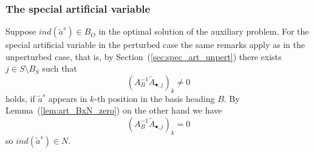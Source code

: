 \documentclass[a4paper]{article}
\begin{document}
\subsubsection{The special artificial variable}
Suppose $ind(\tilde{a}^{s}) \in B_{O}$ in the optimal solution of the auxiliary
problem.
For the special artificial variable in the perturbed case the same remarks
apply as in the unperturbed case, that is, by
Section~(\ref{sec:spec_art_unpert}) there exists
$j \in S \setminus B_{S}$ such that 
\begin{equation*}
\left(A_{B}^{-1}\tilde{A}_{\bullet,j}\right)_{k} \neq 0
\end{equation*} 
holds, if $\tilde{a}^{s}$ appears in $k$-th position in the basis heading
$B$. By Lemma~(\ref{lem:art_BxN_zero}) on the other hand we have
\begin{equation*}
\left(A_{B}^{-1}\tilde{A}_{\bullet,j}\right)_{k} = 0
\end{equation*} 
so $ind(\tilde{a}^{s}) \in N$.
\end{document}
